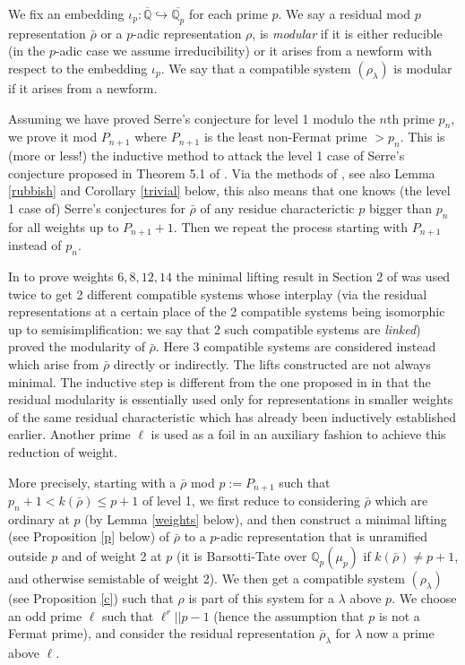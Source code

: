 \documentclass[12pt]{amsart}
\newcommand{\Q}{\mathbb{Q}}
\newcommand{\aQ}{\overline{\mathbb{Q}}}
\newcommand{\aQp}{\overline{\mathbb{Q}_{p}}}
\newcommand{\rhobar}{\overline{\rho}}
\def\rhobar{ {\bar {\rho} } }
\begin{document}
We fix an embedding $\iota_p:\aQ \hookrightarrow \aQp$ for each prime $p$. 
We say a residual mod $p$ representation $\rhobar$ or a $p$-adic 
representation $\rho$, is {\it modular} if it is either reducible (in the $p$-adic case we assume irreducibility) or it arises from a newform with respect to the embedding $\iota_p$.
We say that a compatible system $(\rho_{\lambda})$ is modular if it arises from a newform.

Assuming we have proved Serre's conjecture for level 1 modulo the $n$th prime $p_n$, we prove it mod $P_{n+1}$ where $P_{n+1}$ is the least non-Fermat prime $>p_n$. This is (more or less!) the inductive method 
to attack the level 1 case of Serre's conjecture 
proposed in Theorem 5.1 of \cite{KW}.
Via the methods of \cite{KW}, see also Lemma \ref{rubbish} and Corollary \ref{trivial} below, this also means that one knows (the level 1 case of) Serre's conjectures for $\rhobar$ of any residue characterictic $p$ bigger than $p_n$ for all weights up to $P_{n+1}+1$. Then we repeat the process starting with $P_{n+1}$ instead of $p_n$.


In \cite{KW} to prove weights $6,8,12,14$ the minimal lifting result in Section 2 of \cite{KW} was used twice to get 2 different compatible systems whose interplay (via the residual representations at a certain place of the 2 compatible systems being isomorphic up to semisimplification: we say that 2 such compatible systems are {\em linked}) proved the modularity
of $\rhobar$. Here 3 compatible systems are considered instead which arise from $\rhobar$ directly or indirectly.
The lifts constructed are not always minimal. The inductive step is different
from the one proposed in \cite{KW} 
in that the residual modularity is essentially used only for representations in  smaller weights of the same residual characteristic which has already been 
inductively established earlier. Another prime $\ell$ is used as a foil in an auxiliary fashion to achieve this reduction of weight.

More precisely, starting with a $\rhobar$ mod $p:=P_{n+1}$ such that
$p_{n}+1 < k(\rhobar)\leq p+1$ of level 1, we first reduce to considering 
$\rhobar$ which are ordinary at $p$ (by Lemma \ref{weights} below), and then construct 
a minimal lifting (see Proposition \ref{p} below) of $\rhobar$ to a $p$-adic representation that is unramified outside $p$ and of weight 2 at $p$ (it is 
Barsotti-Tate 
over $\Q_p(\mu_p)$ if $k(\rhobar) \neq p+1$, and otherwise semistable of weight 2). We then get a compatible system $(\rho_{\lambda})$ (see Proposition \ref{c}) such that $\rho$ is
part of this system for a $\lambda$ above $p$. 
We choose an odd prime $\ell$ such that $\ell^r||p-1$ (hence the assumption that $p$ is not a Fermat prime), 
and consider the residual representation $\overline \rho_{\lambda}$ for $\lambda$ now a prime above $\ell$. 
\end{document}
